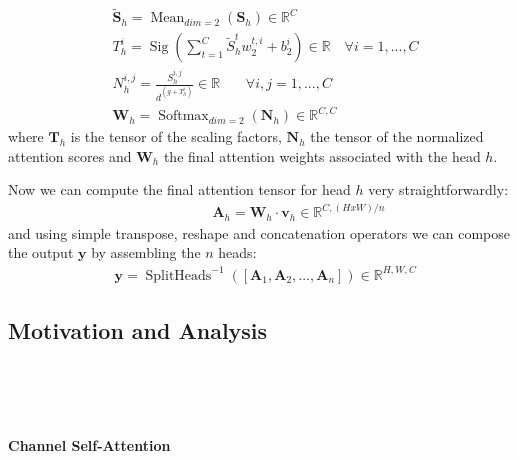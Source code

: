 \documentclass[fleqn,10pt]{SelfArx}
\begin{document}
\begin{align}
		   & \tilde{\mathbf{S}}_{h} = \operatorname{Mean}_{dim=2}(\mathbf{S}_{h}) \in \mathbb{R}^{C}\\[12pt]
             & T_{h}^{i} = \operatorname{Sig}\left(\sum_{t=1}^{C}\tilde{S}_{h}^{t}w_{2}^{t,i} + b_{2}^{i}\right) \in \mathbb{R} \, \, \, \, \, \,  \forall i =1, ..., C\\[2pt]
             & N_{h}^{i,j} = \frac{S_{h}^{i,j}}{d^{(g + T_{h}^{i})}} \in \mathbb{R} \, \, \, \, \, \,  \, \, \, \, \, \forall i, j =1, ..., C\\[12pt]
             & \mathbf{W}_{h} = \operatorname{Softmax}_{dim=2}(\mathbf{N}_{h}) \in \mathbb{R}^{C,C}
\end{align}
where $\mathbf{T}_{h}$ is the tensor of the scaling factors, $\mathbf{N}_{h}$ the tensor of the normalized attention scores and $\mathbf{W}_{h}$ the final attention weights associated with the head $h$.

Now we can compute the final attention tensor for head $h$ very straightforwardly:
\begin{align}
             & \hspace{2cm} \mathbf{A}_{h} = \mathbf{W}_{h} \cdot  \mathbf{v}_{h} \in \mathbb{R}^{C,(HxW)/n}
\end{align}
and using simple transpose, reshape and concatenation operators we can compose the output $\mathbf{y}$ by assembling the $n$ heads:
\begin{align}
             & \mathbf{y} = \operatorname{SplitHeads}^{-1}([\mathbf{A}_{1}, \mathbf{A}_{2}, ..., \mathbf{A}_{n}]) \in \mathbb{R}^{H,W,C}
\end{align}



\subsection{Motivation and Analysis}

\

\,

\paragraph{Channel Self-Attention}

\
\end{document}
